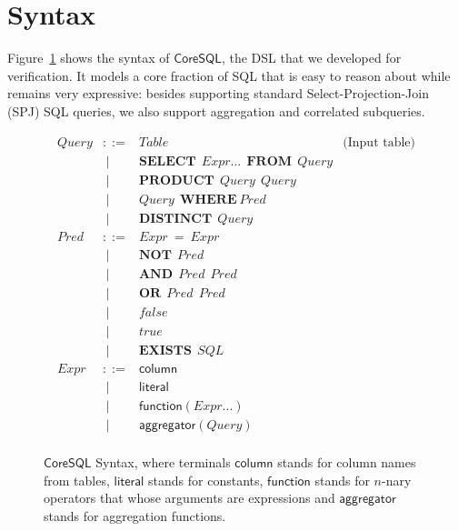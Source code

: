 \section{Syntax}

Figure~\ref{tab:sql-syntax} shows the syntax of $\mathsf{CoreSQL}$, the DSL that we developed for verification. It models a core fraction of SQL that is easy to reason about while remains very expressive: besides supporting standard
Select-Projection-Join (SPJ) SQL queries, we also support aggregation and correlated subqueries.  

\begin{figure}[t]
\centering
\[
\begin{array}{llll}
  \mathit{Query} & ::=  &  \mathit{Table} & \text{(Input table)} \\
        & \; \mid & \mathbf{SELECT}~~\mathit{Expr}...~~\mathbf{FROM}~~\mathit{Query}      \\ 
        & \; \mid  & \mathbf{PRODUCT}~~\mathit{Query}~~\mathit{Query}        \\
        & \; \mid & \mathit{Query}~~\mathbf{WHERE}~\mathit{Pred}        \\
        & \; \mid & \mathbf{DISTINCT}~~\mathit{Query}                \\
  \mathit{Pred} & ::= & \mathit{Expr} ~ \mathbf{=}~\mathit{Expr} \\
       & \; \mid &  \mathbf{NOT} ~~ \mathit{Pred}      \\
       & \; \mid & \mathbf{AND} ~~ \mathit{Pred} ~~ \mathit{Pred}      \\ 
       & \; \mid & \mathbf{OR} ~~ \mathit{Pred} ~~ \mathit{Pred} \\
       & \; \mid & false \\
       & \; \mid & true  \\
       & \; \mid & \mathbf{EXISTS} ~~ SQL \\
  \mathit{Expr} & ::= & \mathsf{column}                     \\
        & \; \mid & \mathsf{literal}                  \\
        & \; \mid & \mathsf{function}(\mathit{Expr}...)     \\
        & \; \mid & \mathsf{aggregator}(\mathit{Query})  \\  
\end{array}
\]
\caption{$\mathsf{CoreSQL}$ Syntax, where terminals $\mathsf{column}$ stands for column names from tables, $\mathsf{literal}$ stands for constants, $\mathsf{function}$ stands for $n$-nary operators that whose arguments are expressions and $\mathsf{aggregator}$ stands for aggregation functions.}
\label{tab:sql-syntax}
\end{figure}

